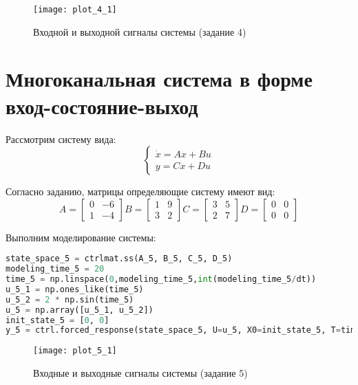 \begin{figure}[h]
    \centering
    \texttt{[image: plot\_4\_1]}
    \caption{\label{fig:The-caption-1}Входной и выходной сигналы системы (задание 4)}
\end{figure}
\pagebreak

\section{Многоканальная система в форме вход-состояние-выход}
Рассмотрим систему вида:
\begin{equation}
    \begin{cases}
        \dot x = Ax + Bu \\
        y = Cx + Du
    \end{cases}
\end{equation}

Согласно заданию, матрицы определяющие систему имеют вид:
\begin{equation*}
    A = \begin{bmatrix}
        0 & -6   \\
        1 &  -4 
        \end{bmatrix}
        B = \begin{bmatrix}
            1 & 9  \\
            3 & 2
            \end{bmatrix}
        C = \begin{bmatrix}
            3 & 5 \\
            2 & 7 
            \end{bmatrix}
        D = \begin{bmatrix}
             0 & 0 \\
             0 & 0
            \end{bmatrix}
\end{equation*}

Выполним моделирование системы:
\begin{lstlisting}[language=Python]
state_space_5 = ctrlmat.ss(A_5, B_5, C_5, D_5)
modeling_time_5 = 20 
time_5 = np.linspace(0,modeling_time_5,int(modeling_time_5/dt))
u_5_1 = np.ones_like(time_5) 
u_5_2 = 2 * np.sin(time_5)
u_5 = np.array([u_5_1, u_5_2])
init_state_5 = [0, 0]
y_5 = ctrl.forced_response(state_space_5, U=u_5, X0=init_state_5, T=time_5).outputs
\end{lstlisting}

\begin{figure}[h]
    \centering
    \texttt{[image: plot\_5\_1]}
    \caption{\label{fig:The-caption-1}Входные и выходные сигналы системы (задание 5)}
\end{figure}
\pagebreak

